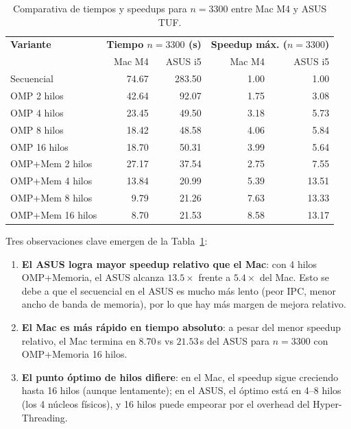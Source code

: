 \documentclass{article}
\begin{document}
\begin{table}[H]
\centering
\begin{tabular}{lrrrr}
\toprule
\textbf{Variante} & \multicolumn{2}{c}{\textbf{Tiempo $n=3300$ (s)}} & \multicolumn{2}{c}{\textbf{Speedup máx. ($n=3300$)}} \\
 & Mac M4 & ASUS i5 & Mac M4 & ASUS i5 \\
\midrule
Secuencial & 74.67 & 283.50 & 1.00 & 1.00 \\
OMP 2 hilos & 42.64 & 92.07 & 1.75 & 3.08 \\
OMP 4 hilos & 23.45 & 49.50 & 3.18 & 5.73 \\
OMP 8 hilos & 18.42 & 48.58 & 4.06 & 5.84 \\
OMP 16 hilos & 18.70 & 50.31 & 3.99 & 5.64 \\
OMP+Mem 2 hilos & 27.17 & 37.54 & 2.75 & 7.55 \\
OMP+Mem 4 hilos & 13.84 & 20.99 & 5.39 & 13.51 \\
OMP+Mem 8 hilos & 9.79 & 21.26 & 7.63 & 13.33 \\
OMP+Mem 16 hilos & 8.70 & 21.53 & 8.58 & 13.17 \\
\bottomrule
\end{tabular}
\caption{Comparativa de tiempos y speedups para $n=3300$ entre Mac M4 y ASUS TUF.}
\label{tab:comparativa}
\end{table}

Tres observaciones clave emergen de la Tabla~\ref{tab:comparativa}:

\begin{enumerate}
    \item \textbf{El ASUS logra mayor speedup relativo que el Mac}: con 4 hilos OMP+Memoria, el ASUS alcanza $13.5\times$ frente a $5.4\times$ del Mac. Esto se debe a que el secuencial en el ASUS es mucho más lento (peor IPC, menor ancho de banda de memoria), por lo que hay más margen de mejora relativo.
    \item \textbf{El Mac es más rápido en tiempo absoluto}: a pesar del menor speedup relativo, el Mac termina en $8.70$\,s vs $21.53$\,s del ASUS para $n=3300$ con OMP+Memoria 16 hilos.
    \item \textbf{El punto óptimo de hilos difiere}: en el Mac, el speedup sigue creciendo hasta 16 hilos (aunque lentamente); en el ASUS, el óptimo está en 4--8 hilos (los 4 núcleos físicos), y 16 hilos puede empeorar por el overhead del Hyper-Threading.
\end{enumerate}

\end{document}
